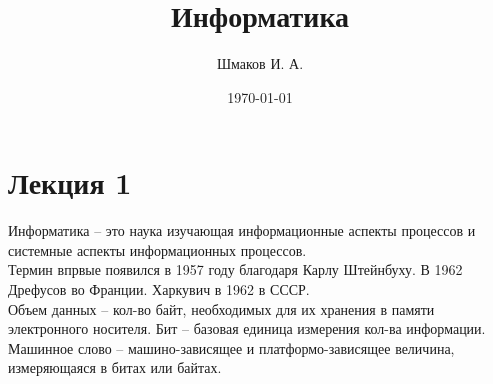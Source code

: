 \documentclass[a4paper, 12pt]{article}
\title{Информатика}
\author{Шмаков И. А.}
\date{\today}
\begin{document}
\maketitle
\section*{Лекция 1}
Информатика -- это наука изучающая информационные аспекты процессов и системные аспекты информационных процессов.\\
Термин впрвые появился в 1957 году благодаря Карлу Штейнбуху. В 1962 Дрефусов во Франции. Харкувич в 1962 в СССР.\\
Объем данных -- кол-во байт, необходимых для их хранения в памяти электронного носителя. Бит -- базовая единица измерения кол-ва информации.\\
Машинное слово -- машино-зависящее и платформо-зависящее величина, измеряющаяся в битах или байтах.
\end{document}
